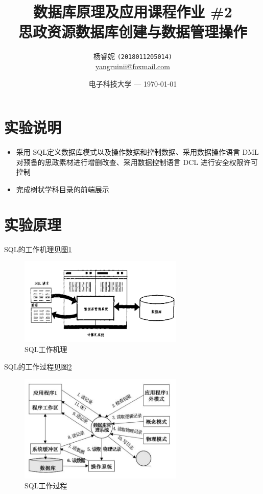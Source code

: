 \documentclass[11pt]{article}
\title{\Large 数据库原理及应用课程作业 \#2 \\
  \LARGE 思政资源数据库创建与数据管理操作} %
\author{杨睿妮 \texttt{(2018011205014)} \\ \url{yangruinii@foxmail.com}} %
\date{电子科技大学 --- \today} %
\begin{document}
  
  \maketitle %

  \section{实验说明}
  \begin{itemize}
    \item 采用 SQL定义数据库模式以及操作数据和控制数据、采用数据操作语言 DML 对预备的思政素材进行增删改查、采用数据控制语言 DCL 进行安全权限许可控制
    \item 完成树状学科目录的前端展示
  \end{itemize}

  \section{实验原理}
  SQL的工作机理见图\ref{tab:SQL1}
    \begin{figure}[h]
    \centering
    \includegraphics[width=0.7\textwidth]{SQL工作机理.png}
    \caption{SQL工作机理}
    \label{tab:SQL1}
  \end{figure}

  SQL的工作过程见图\ref{tab:SQL2}
    \begin{figure}[h]
    \centering
    \includegraphics[width=0.7\textwidth]{SQL工作过程.png}
    \caption{SQL工作过程}
    \label{tab:SQL2}
  \end{figure}
\end{document}
